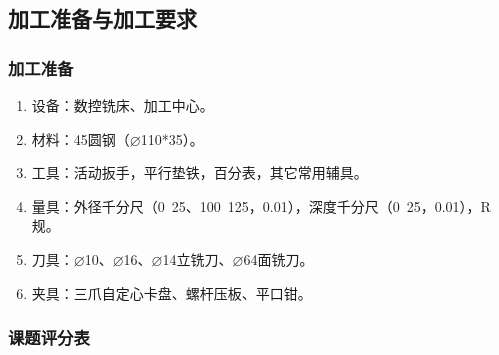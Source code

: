 \vfill
\subsection{加工准备与加工要求}
\subsubsection{加工准备}
\begin{enumerate}[1、]
\item 设备：数控铣床、加工中心。
\item 材料：45圆钢（$\varnothing$110*35）。
\item 工具：活动扳手，平行垫铁，百分表，其它常用辅具。
\item 量具：外径千分尺（0~25、100~125，0.01），深度千分尺（0~25，0.01），R规。
\item 刀具：$\varnothing$10、$\varnothing$16、$\varnothing$14立铣刀、$\varnothing$64面铣刀。
\item 夹具：三爪自定心卡盘、螺杆压板、平口钳。
\end{enumerate}
\subsubsection{课题评分表}

